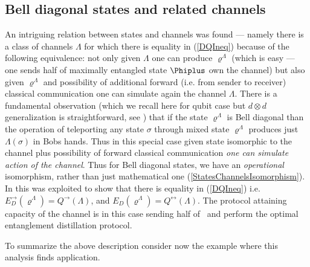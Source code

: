 \documentclass[rmp,12pt,preprint]{revtex4-2}
\begin{document}
\subsection{Bell diagonal states  and related channels}
An intriguing relation  between states and channels was found
\cite{BDSW1996} --- namely there is a class of channels $\Lambda$ for
which there is equality in (\ref{DQIneq}) because of the following
equivalence: not only given $\Lambda$ one can produce
$\varrho^{\Lambda}$ (which is easy --- one sends half of maximally
entangled state  $\Phiplus$ own the channel) but also given
$\varrho^{\Lambda}$ and possibility of additional forward
(i.e. from sender to receiver) classical communication  one can
simulate again the channel $\Lambda$. There is a fundamental
observation \cite{BDSW1996}(which we recall here for qubit case but
$d \otimes d$ generalization is straightforward, see \cite{gentele})
that if the state $\varrho^{\Lambda}$ is Bell diagonal than the
operation of teleporting any state $\sigma$ through mixed state
$\varrho^{\Lambda}$ produces just $\Lambda(\sigma)$ in Bobs hands.
Thus in this special case given state isomorphic to the channel plus
possibility of forward classical communication {\it one can simulate
action of the channel}. Thus for Bell diagonal states, we have an
{\it operational} isomorphism, rather than just mathematical one
(\ref{StatesChannelsIsomorphism}). In  \cite{BDSW1996} this was
exploited to show that there is equality in (\ref{DQIneq}) i.e.
$E_{D}^{\rightarrow}(\varrho^{\Lambda})=Q^{\rightarrow}(\Lambda)$,
and $E_D(\varrho^\Lambda)=Q^\leftrightarrow(\Lambda)$. The protocol attaining
capacity of the channel is in this case sending half of \singlet\
and perform the optimal entanglement distillation protocol.

To summarize the above description consider now the example where
this analysis finds application.
\end{document}
